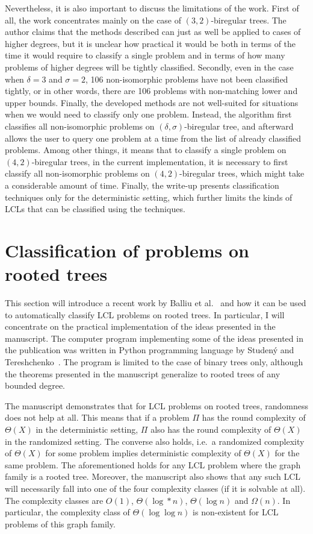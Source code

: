 Nevertheless, it is also important to discuss the limitations of the work. First of all,
the work concentrates mainly on the case of $(3, 2)$-biregular trees. The author claims that
the methods described can just as well be applied to cases of higher degrees, but it is unclear
how practical it would be both in terms of the time it would require to classify a single problem
and in terms of how many problems of higher degrees will be tightly classified. Secondly,
even in the case when $\delta = 3$ and $\sigma = 2$, 106 non-isomorphic problems have not been
classified tightly, or in other words, there are 106 problems with non-matching lower and upper bounds.
Finally, the developed methods are not well-suited for situations when we would need to
classify only one problem. Instead, the algorithm first classifies all non-isomorphic
problems on $(\delta, \sigma)$-biregular tree, and afterward allows the user to query
one problem at a time from the list of already classified problems. Among other things,
it means that to classify a single problem on $(4, 2)$-biregular trees, in the current
implementation, it is necessary to first classify all non-isomorphic problems on $(4, 2)$-biregular trees,
which might take a considerable amount of time. Finally, the write-up presents classification
techniques only for the deterministic setting, which further limits the kinds of LCLs that
can be classified using the techniques.

\section{Classification of problems on rooted trees}

This section will introduce a recent work by Balliu et al.~\cite{Balliu2021}
and how it can be used to automatically classify LCL problems on rooted trees.
In particular, I will concentrate on the practical implementation of the
ideas presented in the manuscript. The computer program implementing some of the ideas presented in the
publication was written in Python programming language by Studený and
Tereshchenko~\cite{Studeny2021}. The program is limited to the case
of binary trees only, although the theorems presented in the manuscript
generalize to rooted trees of any bounded degree.

The manuscript demonstrates that for LCL problems on rooted trees,
randomness does not help at all. This means that if a problem $\Pi$
has the round complexity of $\Theta(X)$ in the deterministic setting, $\Pi$
also has the round complexity of $\Theta(X)$ in the randomized setting. The
converse also holds, i.e.\ a randomized complexity of $\Theta(X)$ for some
problem implies deterministic complexity of $\Theta(X)$ for the same problem.
The aforementioned holds for any LCL problem where the graph family is
a rooted tree. Moreover, the manuscript also shows that any such LCL will
necessarily fall into one of the four complexity classes (if it is solvable at all). The complexity classes are $O(1)$, $\Theta(\log* n)$, $\Theta(\log n)$
and $\Omega(n)$. In particular, the complexity class of $\Theta(\log \log n)$
is non-existent for LCL problems of this graph family.

